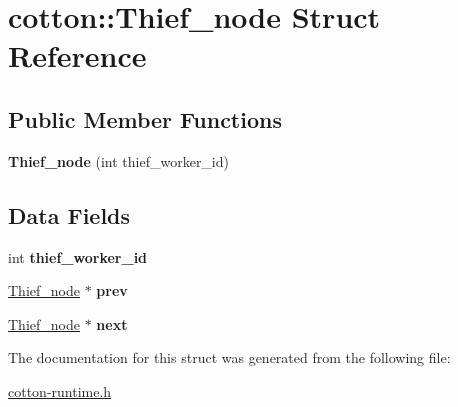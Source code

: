 \hypertarget{structcotton_1_1Thief__node}{}\section{cotton\+:\+:Thief\+\_\+node Struct Reference}
\label{structcotton_1_1Thief__node}
\subsection*{Public Member Functions}
\begin{DoxyCompactItemize}
\item 
\mbox{\label{structcotton_1_1Thief__node_aa4777decc875af911a22c3f183a5103d}} 
{\bfseries Thief\+\_\+node} (int thief\+\_\+worker\+\_\+id)
\end{DoxyCompactItemize}
\subsection*{Data Fields}
\begin{DoxyCompactItemize}
\item 
\mbox{\label{structcotton_1_1Thief__node_a886df3af83a8aa3ca4e08822334499ad}} 
int {\bfseries thief\+\_\+worker\+\_\+id}
\item 
\mbox{\label{structcotton_1_1Thief__node_a2421bac102d0071c86c6f4e455357dba}} 
\mbox{\hyperlink{structcotton_1_1Thief__node}{Thief\+\_\+node}} $\ast$ {\bfseries prev}
\item 
\mbox{\label{structcotton_1_1Thief__node_a4a77470a0b3e2671aa49a32ed16f316a}} 
\mbox{\hyperlink{structcotton_1_1Thief__node}{Thief\+\_\+node}} $\ast$ {\bfseries next}
\end{DoxyCompactItemize}


The documentation for this struct was generated from the following file\+:\begin{DoxyCompactItemize}
\item 
\mbox{\hyperlink{cotton-runtime_8h}{cotton-\/runtime.\+h}}\end{DoxyCompactItemize}
